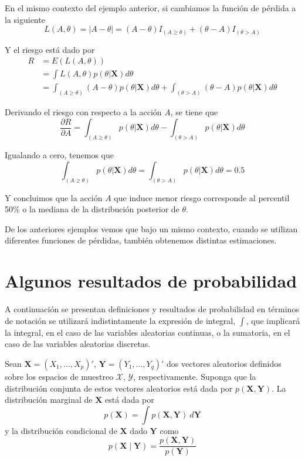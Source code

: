 \documentclass[10pt,openright]{book}\usepackage[]{graphicx}\usepackage[]{color}
\begin{document}
\begin{Eje}
En el mismo contexto del ejemplo anterior, si cambiamos la función de pérdida a la siguiente
\begin{equation*}
L(A,\theta)=|A-\theta|=(A-\theta)I_{(A\geq\theta)}+(\theta-A)I_{(\theta>A)}
\end{equation*}

Y el riesgo está dado por
\begin{align*}
R&=E(L(A,\theta))\\
&=\int L(A,\theta)p(\theta|\mathbf{X})d\theta\\
&=\int_{(A\geq\theta)}(A-\theta)p(\theta|\mathbf{X})d\theta+\int_{(\theta>A)}(\theta-A)p(\theta|\mathbf{X})d\theta
\end{align*}

Derivando el riesgo con respecto a la acción $A$, se tiene que
\begin{equation*}
\frac{\partial R}{\partial A}=\int_{(A\geq\theta)}p(\theta|\mathbf{X})d\theta-\int_{(\theta>A)}p(\theta|\mathbf{X})d\theta
\end{equation*}

Igualando a cero, tenemos que
\begin{equation*}
\int_{(A\geq\theta)}p(\theta|\mathbf{X})d\theta=\int_{(\theta>A)}p(\theta|\mathbf{X})d\theta=0.5
\end{equation*}

Y concluimos que la acción $A$ que induce menor riesgo corresponde al percentil 50\% o la mediana de la distribución posterior de $\theta$.
\end{Eje}

De los anteriores ejemplos vemos que bajo un mismo contexto, cuando se utilizan diferentes funciones de pérdidas, también obtenemos distintas estimaciones.

\section{Algunos resultados de probabilidad}

A continuación se presentan definiciones y resultados de probabilidad en términos de notación se utilizará indistintamente la expresión de integral, $\int$, que implicará la integral, en el caso de las variables aleatorias continuas, o la sumatoria, en el caso de las variables aleatorias discretas.

\begin{Defi}
Sean $\mathbf{X}=(X_1,\ldots,X_p)'$, $\mathbf{Y}=(Y_1,\ldots,Y_q)'$ dos vectores aleatorios definidos sobre los espacios de  muestreo $\mathcal{X}$, $\mathcal{Y}$, respectivamente. Suponga que la distribución conjunta de estos vectores aleatorios está dada por $p(\mathbf{X},\mathbf{Y})$. La distribución marginal de $\mathbf{X}$ está dada por
\begin{equation}
p(\mathbf{X})=\int p(\mathbf{X},\mathbf{Y})\ d\mathbf{Y}
\end{equation}
y la distribución condicional de $\mathbf{X}$ dado $\mathbf{Y}$ como
\begin{equation}
p(\mathbf{X} \mid \mathbf{Y})
=\frac{p(\mathbf{X},\mathbf{Y})}{p(\mathbf{Y})}
\end{equation}
\end{Defi}
\end{document}
